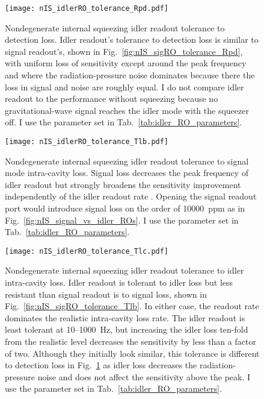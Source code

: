 \begin{figure}
    \centering
    \texttt{[image: nIS\_idlerRO\_tolerance\_Rpd.pdf]} 
    \caption{Nondegenerate internal squeezing idler readout tolerance to detection loss. Idler readout's tolerance to detection loss is similar to signal readout's, shown in Fig.~\ref{fig:nIS_sigRO_tolerance_Rpd}, with uniform loss of sensitivity except around the peak frequency and where the radiation-pressure noise dominates because there the loss in signal and noise are roughly equal. I do not compare idler readout to the performance without squeezing because no gravitational-wave signal reaches the idler mode with the squeezer off. I use the parameter set in Tab.~\ref{tab:idler_RO_parameters}.}
    \label{fig:nIS_idlerRO_tolerance_Rpd}
\end{figure}
\begin{figure}
	\centering
	\texttt{[image: nIS\_idlerRO\_tolerance\_Tlb.pdf]}
	\caption{Nondegenerate internal squeezing idler readout tolerance to signal mode intra-cavity loss. Signal loss decreases the peak frequency of idler readout but strongly broadens the sensitivity improvement independently of the idler readout rate . Opening the signal readout port would introduce signal loss on the order of 10000~ppm as in Fig.~\ref{fig:nIS_signal_vs_idler_ROs}. I use the parameter set in Tab.~\ref{tab:idler_RO_parameters}.}
	\label{fig:nIS_idlerRO_tolerance_Tlb}
\end{figure}
\begin{figure}
	\centering
	\texttt{[image: nIS\_idlerRO\_tolerance\_Tlc.pdf]}
	\caption{ Nondegenerate internal squeezing idler readout tolerance to idler intra-cavity loss. Idler readout is tolerant to idler loss but less resistant than signal readout is to signal loss, shown in Fig.~\ref{fig:nIS_sigRO_tolerance_Tlb}. In either case, the readout rate dominates the realistic intra-cavity loss rate. The idler readout is least tolerant at 10--1000~Hz, but increasing the idler loss ten-fold from the realistic level decreases the sensitivity by less than a factor of two. Although they initially look similar, this tolerance is different to detection loss in Fig.~\ref{fig:nIS_idlerRO_tolerance_Rpd} as idler loss decreases the radiation-pressure noise and does not affect the sensitivity above the peak. I use the parameter set in Tab.~\ref{tab:idler_RO_parameters}.}
	\label{fig:nIS_idlerRO_tolerance_Tlc}
\end{figure}
